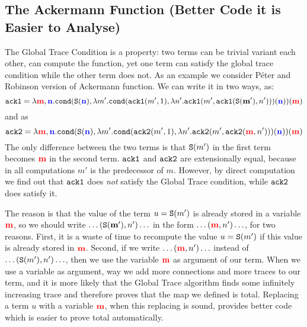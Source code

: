 \subsection{The Ackermann Function (Better Code it is Easier to Analyse)}
The Global Trace Condition is a  property: two
terms can be trivial variant each other, can compute the function, yet
one term can satisfy the global trace condition while the other term does not.
As an example we consider Péter and Robinson version of Ackermann function. We can write it in two ways, as:
  \[
  {\tt ack1} = \lambda {{\bf \color{red}{m}}}, {{\bf \color{blue}{n}}}.{\tt cond}({\tt S}({{\bf \color{blue}{n}}}),\lambda m'.{\tt cond}({\tt ack1}(m',1),\lambda n'.{\tt ack1}(m',{\tt ack1}(\mathbf{{\tt S}(m')},n')))({{\bf \color{blue}{n}}}))({{\bf \color{red}{m}}})
  \]
and as 
  \[
  {\tt ack2} = \lambda {{\bf \color{red}{m}}}, {{\bf \color{blue}{n}}}.
{\tt cond}({\tt S}({{\bf \color{blue}{n}}}),\lambda m'.{\tt cond}({\tt ack2}(m',1),\lambda n'.{\tt ack2}(m',{\tt ack2}({{\bf \color{red}{m}}},n')))({{\bf \color{blue}{n}}}))({{\bf \color{red}{m}}})
  \]
The only difference between the two terms is that ${\tt S}(m')$ in the first
term becomes ${{\bf \color{red}{m}}}$ in the second term. ${\tt ack1}$ and ${\tt ack2}$ are 
extensionally equal, because in all computations $m'$ is the predecessor of $m$. 
However, by direct computation we find out that 
${\tt ack1}$ does \emph{not} satisfy the Global Trace condition, while ${\tt ack2}$ does
satisfy it. 

The reason is that the value of the term $u= {\tt S}(m')$ is already stored in a 
variable ${{\bf \color{red}{m}}}$, so we should write $\ldots (\mathbf{{\tt S}(m')},n') \ldots$ in the 
form  $\ldots ({{\bf \color{red}{m}}},n') \ldots$, for two reasons.
First, it is a waste of time to recompute the value $u= {\tt S}(m')$ if this value is 
already stored in ${{\bf \color{red}{m}}}$. Second, if we write $\ldots ({{\bf \color{red}{m}}},n') \ldots$ instead of 
$\ldots ({\tt S}(m'),n') \ldots$, then we use the variable ${{\bf \color{red}{m}}}$ as argument of our
term. When we use a variable as argument, way we add more connections and 
more traces to our term, and it is more likely that the Global Trace algorithm finds 
some infinitely increasing trace and therefore proves that the map we defined is 
total. Replacing  a term $u$ with a variable ${{\bf \color{red}{m}}}$, when this replacing is sound, 
provides better code which is easier to prove total automatically.
